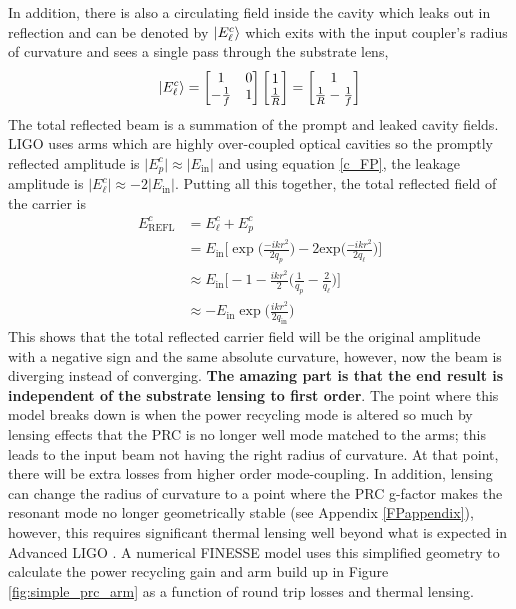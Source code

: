		In addition, there is also a circulating field inside the cavity which leaks out in reflection and can be denoted by $\ket{E^c_{\ell}}$ which exits with the input coupler's radius of curvature and sees a single pass through the substrate lens,
		\begin{equation}\label{eq:leakE}
		\ket{E^c_{\ell}} = 		 
		\begin{bmatrix}
		1 	&	0 
		\\ 	-\frac{1}{f} 	&	1
		\end{bmatrix}
		\begin{bmatrix}
		1  
		\\ 	\frac{1}{R}
		\end{bmatrix}
		=
		\begin{bmatrix}
		1  
		\\ 	\frac{1}{R} - \frac{1}{f}
		\end{bmatrix}
		\end{equation}
		The total reflected beam is a summation of the prompt and leaked cavity fields.  LIGO uses arms which are highly over-coupled optical cavities so the promptly reflected amplitude is $\vert E^c_p \vert \approx \vert E_{\text{in}} \vert$ and using equation \ref{c_FP}, the leakage amplitude is $\vert E^c_\ell \vert \approx -2\vert E_{\text{in}} \vert$.  Putting all this together, the total reflected field of the carrier is
		\begin{equation}
		\begin{aligned}
		E^c_{\text{REFL}} 	&= E^c_{\ell} + E^c_p \\
							&= E_{\text{in}} \bigg[ \exp \bigg(\frac{-ik r^2}{2q_p}\bigg) - 2  \text{exp} \bigg(\frac{-ik r^2}{2q_{\ell}}\bigg) \bigg]\\
							&\approx E_{\text{in}} \bigg[ -1 - \frac{ikr^2}{2} \bigg( \frac{1}{q_p} - \frac{2}{q_\ell} \bigg) \bigg]\\
							&\approx -E_{\text{in}} \exp\bigg(\frac{ikr^2}{2q_{\text{in}}}\bigg) 
		\end{aligned} 
		\end{equation}
		This shows that the total reflected carrier field will be the original amplitude with a negative sign and the same absolute curvature, however, now the beam is diverging instead of converging.  \textbf{The amazing part is that the end result is independent of the substrate lensing to first order}.  The point where this model breaks down is when the power recycling mode is altered so much by lensing effects that the PRC is no longer well mode matched to the arms; this leads to the input beam not having the right radius of curvature.  At that point, there will be extra losses from higher order mode-coupling.  In addition, lensing can change the radius of curvature to a point where the PRC g-factor makes the resonant mode no longer geometrically stable (see Appendix \ref{FPappendix}), however, this requires significant thermal lensing well beyond what is expected in Advanced LIGO \cite{Lawrence_TCS}.  A numerical FINESSE model uses this simplified geometry to calculate the power recycling gain and arm build up in Figure \ref{fig:simple_prc_arm} as a function of round trip losses and thermal lensing.
